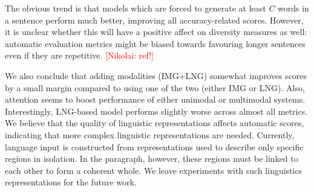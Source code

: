 \documentclass[11pt,a4paper]{article}
\newcommand{\kibitz}[2]{\ifnum\Comments=1\textcolor{#1}{#2}\fi}
\newcommand{\nikolai}[1]{\kibitz{red}      {[Nikolai: #1]}}
\begin{document}
The obvious trend is that models which are forced to generate at least $C$ words in a sentence perform much better, improving all accuracy-related scores.
However, it is unclear whether this will have a positive affect on diversity measures as well: automatic evaluation metrics might be biased towards favouring longer sentences even if they are repetitive.
\nikolai{ref!}

We also conclude that adding modalities (IMG+LNG) somewhat improves scores by a small margin compared to using one of the two (either IMG or LNG).
Also, attention seems to boost performance of either unimodal or multimodal systems.
Interestingly, LNG-based model performs slightly worse across almost all metrics.
We believe that the quality of linguistic representations affects automatic scores, indicating that more complex linguistic representations are needed.
Currently, language input is constructed from representations used to describe only specific regions in isolation.
In the paragraph, however, these regions must be linked to each other to form a coherent whole.
We leave experiments with such linguistics representations for the future work.
\end{document}
